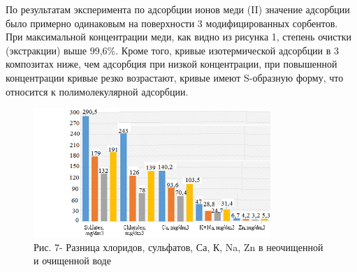 \begin{multicols}{2}
По результатам эксперимента по адсорбции ионов меди (II) значение
адсорбции было примерно одинаковым на поверхности 3 модифицированных
сорбентов. При максимальной концентрации меди, как видно из рисунка 1,
степень очистки (экстракции) выше 99,6\%. Кроме того, кривые
изотермической адсорбции в 3 композитах ниже, чем адсорбция при низкой
концентрации, при повышенной концентрации кривые резко возрастают,
кривые имеют S-образную форму, что относится к полимолекулярной
адсорбции.
\end{multicols}

\begin{figure}[H]
	\centering
	\includegraphics[width=0.8\textwidth]{media/chem/image8}
	\caption*{Рис. 7- Разница хлоридов, сульфатов, Са, К, Na, Zn в неочищенной
и очищенной воде}
\end{figure}

